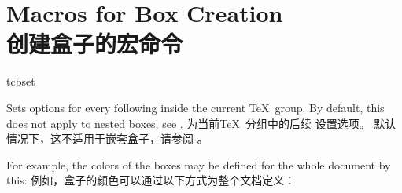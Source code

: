 
\section{Macros for Box Creation\\创建盒子的宏命令}%
%










\begin{docCommand}{tcbset}{}
\begin{stripedbox}
Sets options for every following  inside the current \TeX\ group.
By default, this does not apply to nested boxes, see .
\tcblower
为当前\TeX\ 分组中的后续  设置选项。
默认情况下，这不适用于嵌套盒子，请参阅 。
\end{stripedbox}

\begin{stripedbox}
For example, the colors of the boxes may be defined for the whole document by this:
\tcblower
例如，盒子的颜色可以通过以下方式为整个文档定义：
\end{stripedbox}
  
\begin{dispListing}
\end{dispListing}
\end{docCommand}


